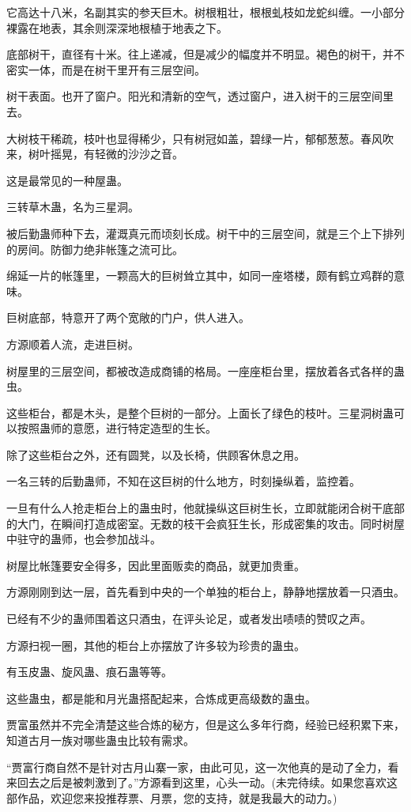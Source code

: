 \begin{this_body}
它高达十八米，名副其实的参天巨木。树根粗壮，根根虬枝如龙蛇纠缠。一小部分裸露在地表，其余则深深地根植于地表之下。

底部树干，直径有十米。往上递减，但是减少的幅度并不明显。褐色的树干，并不密实一体，而是在树干里开有三层空间。

树干表面。也开了窗户。阳光和清新的空气，透过窗户，进入树干的三层空间里去。

大树枝干稀疏，枝叶也显得稀少，只有树冠如盖，碧绿一片，郁郁葱葱。春风吹来，树叶摇晃，有轻微的沙沙之音。

这是最常见的一种屋蛊。

三转草木蛊，名为三星洞。

被后勤蛊师种下去，灌溉真元而顷刻长成。树干中的三层空间，就是三个上下排列的房间。防御力绝非帐篷之流可比。

绵延一片的帐篷里，一颗高大的巨树耸立其中，如同一座塔楼，颇有鹤立鸡群的意味。

巨树底部，特意开了两个宽敞的门户，供人进入。

方源顺着人流，走进巨树。

树屋里的三层空间，都被改造成商铺的格局。一座座柜台里，摆放着各式各样的蛊虫。

这些柜台，都是木头，是整个巨树的一部分。上面长了绿色的枝叶。三星洞树蛊可以按照蛊师的意愿，进行特定造型的生长。

除了这些柜台之外，还有圆凳，以及长椅，供顾客休息之用。

一名三转的后勤蛊师，不知在这巨树的什么地方，时刻操纵着，监控着。

一旦有什么人抢走柜台上的蛊虫时，他就操纵这巨树生长，立即就能闭合树干底部的大门，在瞬间打造成密室。无数的枝干会疯狂生长，形成密集的攻击。同时树屋中驻守的蛊师，也会参加战斗。

树屋比帐篷要安全得多，因此里面贩卖的商品，就更加贵重。

方源刚刚到达一层，首先看到中央的一个单独的柜台上，静静地摆放着一只酒虫。

已经有不少的蛊师围着这只酒虫，在评头论足，或者发出啧啧的赞叹之声。

方源扫视一圈，其他的柜台上亦摆放了许多较为珍贵的蛊虫。

有玉皮蛊、旋风蛊、痕石蛊等等。

这些蛊虫，都是能和月光蛊搭配起来，合炼成更高级数的蛊虫。

贾富虽然并不完全清楚这些合炼的秘方，但是这么多年行商，经验已经积累下来，知道古月一族对哪些蛊虫比较有需求。

“贾富行商自然不是针对古月山寨一家，由此可见，这一次他真的是动了全力，看来回去之后是被刺激到了。”方源看到这里，心头一动。(未完待续。如果您喜欢这部作品，欢迎您来投推荐票、月票，您的支持，就是我最大的动力。)

\end{this_body}

